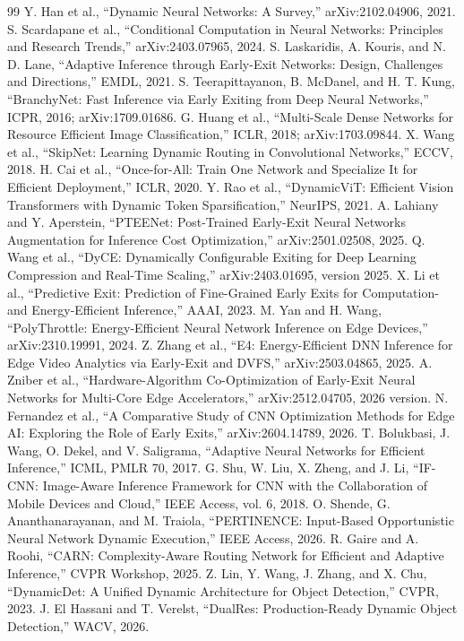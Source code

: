 \documentclass[11pt,a4paper]{article}
\begin{document}
\clearpage
\begin{thebibliography}{99}
\small
{} Y. Han et al., ``Dynamic Neural Networks: A Survey,'' arXiv:2102.04906, 2021.
 S. Scardapane et al., ``Conditional Computation in Neural Networks: Principles and Research Trends,'' arXiv:2403.07965, 2024.
 S. Laskaridis, A. Kouris, and N. D. Lane, ``Adaptive Inference through Early-Exit Networks: Design, Challenges and Directions,'' EMDL, 2021.
 S. Teerapittayanon, B. McDanel, and H. T. Kung, ``BranchyNet: Fast Inference via Early Exiting from Deep Neural Networks,'' ICPR, 2016; arXiv:1709.01686.
 G. Huang et al., ``Multi-Scale Dense Networks for Resource Efficient Image Classification,'' ICLR, 2018; arXiv:1703.09844.
 X. Wang et al., ``SkipNet: Learning Dynamic Routing in Convolutional Networks,'' ECCV, 2018.
 H. Cai et al., ``Once-for-All: Train One Network and Specialize It for Efficient Deployment,'' ICLR, 2020.
 Y. Rao et al., ``DynamicViT: Efficient Vision Transformers with Dynamic Token Sparsification,'' NeurIPS, 2021.
 A. Lahiany and Y. Aperstein, ``PTEENet: Post-Trained Early-Exit Neural Networks Augmentation for Inference Cost Optimization,'' arXiv:2501.02508, 2025.
 Q. Wang et al., ``DyCE: Dynamically Configurable Exiting for Deep Learning Compression and Real-Time Scaling,'' arXiv:2403.01695, version 2025.
 X. Li et al., ``Predictive Exit: Prediction of Fine-Grained Early Exits for Computation- and Energy-Efficient Inference,'' AAAI, 2023.
 M. Yan and H. Wang, ``PolyThrottle: Energy-Efficient Neural Network Inference on Edge Devices,'' arXiv:2310.19991, 2024.
 Z. Zhang et al., ``E4: Energy-Efficient DNN Inference for Edge Video Analytics via Early-Exit and DVFS,'' arXiv:2503.04865, 2025.
 A. Zniber et al., ``Hardware-Algorithm Co-Optimization of Early-Exit Neural Networks for Multi-Core Edge Accelerators,'' arXiv:2512.04705, 2026 version.
 N. Fernandez et al., ``A Comparative Study of CNN Optimization Methods for Edge AI: Exploring the Role of Early Exits,'' arXiv:2604.14789, 2026.
 T. Bolukbasi, J. Wang, O. Dekel, and V. Saligrama, ``Adaptive Neural Networks for Efficient Inference,'' ICML, PMLR 70, 2017.
 G. Shu, W. Liu, X. Zheng, and J. Li, ``IF-CNN: Image-Aware Inference Framework for CNN with the Collaboration of Mobile Devices and Cloud,'' IEEE Access, vol. 6, 2018.
 O. Shende, G. Ananthanarayanan, and M. Traiola, ``PERTINENCE: Input-Based Opportunistic Neural Network Dynamic Execution,'' IEEE Access, 2026.
 R. Gaire and A. Roohi, ``CARN: Complexity-Aware Routing Network for Efficient and Adaptive Inference,'' CVPR Workshop, 2025.
 Z. Lin, Y. Wang, J. Zhang, and X. Chu, ``DynamicDet: A Unified Dynamic Architecture for Object Detection,'' CVPR, 2023.
 J. El Hassani and T. Verelst, ``DualRes: Production-Ready Dynamic Object Detection,'' WACV, 2026.
\end{thebibliography}
\end{document}
